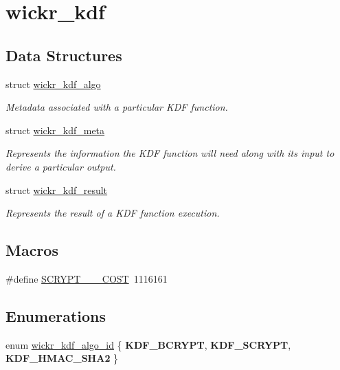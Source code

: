 \hypertarget{group__wickr__kdf}{}\section{wickr\+\_\+kdf}
\label{group__wickr__kdf}
\subsection*{Data Structures}
\begin{DoxyCompactItemize}
\item 
struct \hyperlink{structwickr__kdf__algo}{wickr\+\_\+kdf\+\_\+algo}
\begin{DoxyCompactList}\small\item\em Metadata associated with a particular K\+DF function. \end{DoxyCompactList}\item 
struct \hyperlink{structwickr__kdf__meta}{wickr\+\_\+kdf\+\_\+meta}
\begin{DoxyCompactList}\small\item\em Represents the information the K\+DF function will need along with it\textquotesingle{}s input to derive a particular output. \end{DoxyCompactList}\item 
struct \hyperlink{structwickr__kdf__result}{wickr\+\_\+kdf\+\_\+result}
\begin{DoxyCompactList}\small\item\em Represents the result of a K\+DF function execution. \end{DoxyCompactList}\end{DoxyCompactItemize}
\subsection*{Macros}
\begin{DoxyCompactItemize}
\item 
\#define \hyperlink{group__wickr__kdf_ga5e8df13eb2cd5cc1e09f377675ddc50f}{S\+C\+R\+Y\+P\+T\+\_\+\_\+\_\+\+C\+O\+ST}~1116161
\end{DoxyCompactItemize}
\subsection*{Enumerations}
\begin{DoxyCompactItemize}
\item 
enum \hyperlink{group__wickr__kdf_ga106149e3507106abb6b5be843a4e7c16}{wickr\+\_\+kdf\+\_\+algo\+\_\+id} \{ {\bfseries K\+D\+F\+\_\+\+B\+C\+R\+Y\+PT}, 
{\bfseries K\+D\+F\+\_\+\+S\+C\+R\+Y\+PT}, 
{\bfseries K\+D\+F\+\_\+\+H\+M\+A\+C\+\_\+\+S\+H\+A2}
 \}
\end{DoxyCompactItemize}
